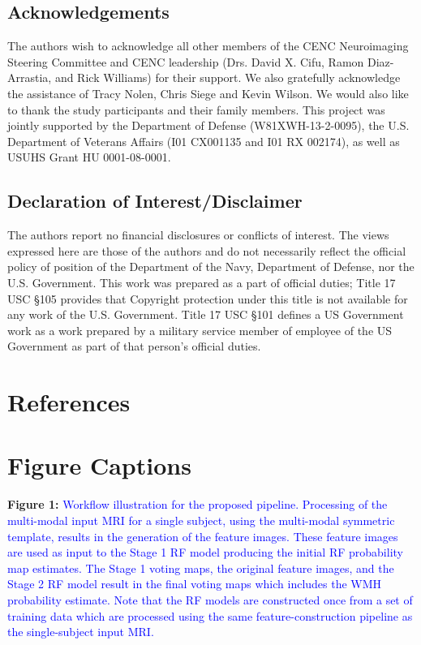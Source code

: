 \documentclass[11pt,]{article}
\begin{document}
\clearpage

\subsection{Acknowledgements}\label{acknowledgements}

The authors wish to acknowledge all other members of the CENC
Neuroimaging Steering Committee and CENC leadership (Drs. David X. Cifu,
Ramon Diaz-Arrastia, and Rick Williams) for their support. We also
gratefully acknowledge the assistance of Tracy Nolen, Chris Siege and
Kevin Wilson. We would also like to thank the study participants and
their family members. This project was jointly supported by the
Department of Defense (W81XWH-13-2-0095), the U.S. Department of
Veterans Affairs (I01 CX001135 and I01 RX 002174), as well as USUHS
Grant HU 0001-08-0001.

\subsection{Declaration of
Interest/Disclaimer}\label{declaration-of-interestdisclaimer}

The authors report no financial disclosures or conflicts of interest.
The views expressed here are those of the authors and do not necessarily
reflect the official policy of position of the Department of the Navy,
Department of Defense, nor the U.S. Government. This work was prepared
as a part of official duties; Title 17 USC §105 provides that Copyright
protection under this title is not available for any work of the U.S.
Government. Title 17 USC §101 defines a US Government work as a work
prepared by a military service member of employee of the US Government
as part of that person's official duties.

\clearpage

\section{References}\label{references}

\section{Figure Captions}\label{figure-captions}

\textbf{Figure 1:}
\textcolor{blue}{Workflow illustration for the proposed pipeline.  Processing of the multi-modal
input MRI for a single subject, using the multi-modal symmetric template, results in
the generation of the feature images.  These feature images are used as input to the
Stage 1 RF model producing the initial RF probability map estimates.  The Stage 1
voting maps, the original feature images, and the Stage 2 RF model result in the
final voting maps which includes the WMH probability estimate.  Note that the RF models
are constructed once from a set of training data which are processed using the
same feature-construction pipeline as the single-subject input MRI.}
\end{document}
